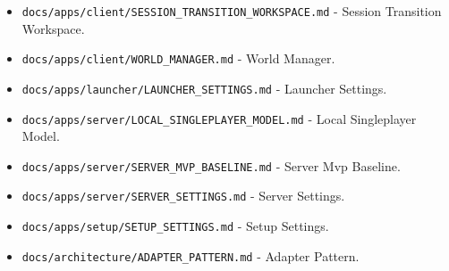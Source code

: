\documentclass[9pt,a4paper,openany]{book}
\begin{document}
\begin{itemize}
\item \texttt{docs/\allowbreak{}apps/\allowbreak{}client/\allowbreak{}SESSION\_\allowbreak{}TRANSITION\_\allowbreak{}WORKSPACE.\allowbreak{}md} -\allowbreak{} Session Transition Workspace.\allowbreak{}
\end{itemize}

\begin{itemize}
\item \texttt{docs/\allowbreak{}apps/\allowbreak{}client/\allowbreak{}WORLD\_\allowbreak{}MANAGER.\allowbreak{}md} -\allowbreak{} World Manager.\allowbreak{}
\end{itemize}

\begin{itemize}
\item \texttt{docs/\allowbreak{}apps/\allowbreak{}launcher/\allowbreak{}LAUNCHER\_\allowbreak{}SETTINGS.\allowbreak{}md} -\allowbreak{} Launcher Settings.\allowbreak{}
\end{itemize}

\begin{itemize}
\item \texttt{docs/\allowbreak{}apps/\allowbreak{}server/\allowbreak{}LOCAL\_\allowbreak{}SINGLEPLAYER\_\allowbreak{}MODEL.\allowbreak{}md} -\allowbreak{} Local Singleplayer Model.\allowbreak{}
\end{itemize}

\begin{itemize}
\item \texttt{docs/\allowbreak{}apps/\allowbreak{}server/\allowbreak{}SERVER\_\allowbreak{}MVP\_\allowbreak{}BASELINE.\allowbreak{}md} -\allowbreak{} Server Mvp Baseline.\allowbreak{}
\end{itemize}

\begin{itemize}
\item \texttt{docs/\allowbreak{}apps/\allowbreak{}server/\allowbreak{}SERVER\_\allowbreak{}SETTINGS.\allowbreak{}md} -\allowbreak{} Server Settings.\allowbreak{}
\end{itemize}

\begin{itemize}
\item \texttt{docs/\allowbreak{}apps/\allowbreak{}setup/\allowbreak{}SETUP\_\allowbreak{}SETTINGS.\allowbreak{}md} -\allowbreak{} Setup Settings.\allowbreak{}
\end{itemize}

\begin{itemize}
\item \texttt{docs/\allowbreak{}architecture/\allowbreak{}ADAPTER\_\allowbreak{}PATTERN.\allowbreak{}md} -\allowbreak{} Adapter Pattern.\allowbreak{}
\end{itemize}
\end{document}
